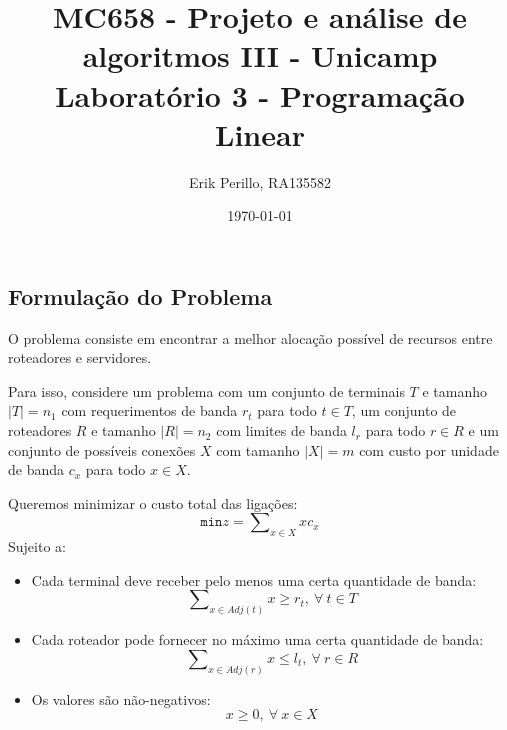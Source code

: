 \documentclass[7pt]{article}
\newcommand{\tbf}[1]{\textbf{#1}}
\newcommand{\ttt}[1]{\texttt{#1}}
\begin{document}
\author{\small Erik Perillo, RA135582}
\date{\small \today}
\title{\vspace{-2cm}%
	{\small MC658 - Projeto e análise de algoritmos III - Unicamp}\\
    {\Large \tbf{Laboratório 3 - Programação Linear}}}
\maketitle\vspace{-0.5cm}

\begin{multicols}{2}

\section{Formulação do Problema}
O problema consiste em encontrar a melhor alocação possível de recursos entre
roteadores e servidores.

Para isso, considere um problema com
um conjunto de terminais $T$ e tamanho $|T| = n_1$
com requerimentos de banda $r_t$ para todo $t \in T$,
um conjunto de roteadores $R$ e tamanho $|R| = n_2$
com limites de banda $l_r$ para todo $r \in R$ e
um conjunto de possíveis conexões $X$ com tamanho $|X| = m$
com custo por unidade de banda $c_x$ para todo $x \in X$.

Queremos minimizar o custo total das ligações:
$$\ttt{min} z = \sum\nolimits_{x \in X}xc_x$$
Sujeito a:
\begin{itemize}
    \item Cada terminal deve receber pelo menos uma certa quantidade de banda:
        $$\sum\nolimits_{x \in Adj(t)}x \ge r_t, ~\forall~t \in T$$

    \item Cada roteador pode fornecer no máximo uma certa quantidade de banda:
        $$\sum\nolimits_{x \in Adj(r)}x \le l_t, ~\forall~r \in R$$

    \item Os valores são não-negativos:
        $$x \ge 0, ~\forall~x \in X$$
\end{itemize}

\end{multicols}
\end{document}
